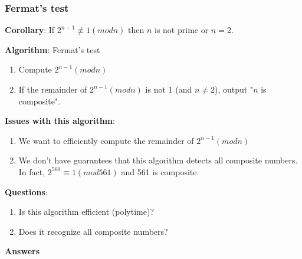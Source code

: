 \documentclass[9pt, letterpaper, oneside]{article}
\begin{document}
\subsubsection{Fermat's test}

\textbf{Corollary}: If $2^{n-1} \not\equiv 1 (mod n)$ then $n$ is not prime or $n = 2$.

\textbf{Algorithm}: Fermat's test 
\begin{enumerate}
\item Compute $2^{n-1} (mod n)$
\item If the remainder of $2^{n-1} (mod n)$ is not 1 (and $n \neq 2$), output "$n$ is composite".
\end{enumerate}

\textbf{Issues with this algorithm}:
\begin{enumerate}
\item We want to efficiently compute the remainder of $2^{n-1} (mod n)$
\item We don't have guarantees that this algorithm detects all composite numbers.\\
In fact, $2^{560} \equiv 1 (mod 561)$ and 561 is composite.
\end{enumerate}


\textbf{Questions}:

\begin{enumerate}
\item Is this algorithm efficient (polytime)?
\item Does it recognize all composite numbers?
\end{enumerate}

\textbf{Answers}
\end{document}
